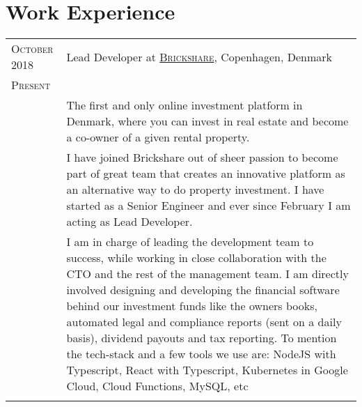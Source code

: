 \documentclass[a4paper,10pt]{article}
\begin{document}
\section{Work Experience}
\begin{longtable}{p{2.5cm}|p{11cm}}

 \raggedleft \textsc{October 2018} & Lead Developer at
 \textsc{\href{https://www.brickshare.dk/}{Brickshare}}, Copenhagen, Denmark
 \\\raggedleft \textsc{Present}\\& 
 \footnotesize{The first and only online investment platform in Denmark, where you can invest in real estate and become a co-owner of a given rental property.}\\

& \footnotesize{I have joined Brickshare out of sheer passion to become part of great team that creates an innovative platform as an alternative way to do property investment. I have started as a Senior Engineer and ever since February I am acting as Lead Developer.}\\
& \footnotesize{I am in charge of leading the development team to success, while working in close collaboration with the CTO and the rest of the management team. I am directly involved designing and developing the financial software behind our investment funds like the owners books, automated legal and compliance reports (sent on a daily basis), dividend payouts and tax reporting. To mention the tech-stack and a few tools we use are: NodeJS with Typescript, React with Typescript, Kubernetes in Google Cloud, Cloud Functions, MySQL, etc}\\
\multicolumn{2}{c}{} \\ 


\end{longtable}
\end{document}
